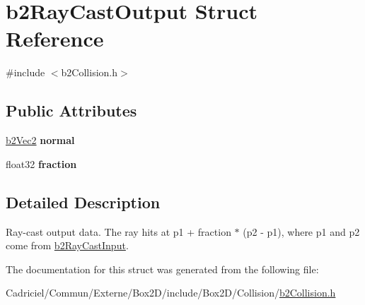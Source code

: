\hypertarget{structb2_ray_cast_output}{}\section{b2\+Ray\+Cast\+Output Struct Reference}
\label{structb2_ray_cast_output}


{\ttfamily \#include $<$b2\+Collision.\+h$>$}

\subsection*{Public Attributes}
\begin{DoxyCompactItemize}
\item 
\hyperlink{structb2_vec2}{b2\+Vec2} {\bfseries normal}\hypertarget{structb2_ray_cast_output_aa9bbfe75afa23c21e85cb1bd3736529b}{}\label{structb2_ray_cast_output_aa9bbfe75afa23c21e85cb1bd3736529b}

\item 
float32 {\bfseries fraction}\hypertarget{structb2_ray_cast_output_a191c69bb399304bfe30c69e2158b3f29}{}\label{structb2_ray_cast_output_a191c69bb399304bfe30c69e2158b3f29}

\end{DoxyCompactItemize}


\subsection{Detailed Description}
Ray-\/cast output data. The ray hits at p1 + fraction $\ast$ (p2 -\/ p1), where p1 and p2 come from \hyperlink{structb2_ray_cast_input}{b2\+Ray\+Cast\+Input}. 

The documentation for this struct was generated from the following file\+:\begin{DoxyCompactItemize}
\item 
Cadriciel/\+Commun/\+Externe/\+Box2\+D/include/\+Box2\+D/\+Collision/\hyperlink{b2_collision_8h}{b2\+Collision.\+h}\end{DoxyCompactItemize}
